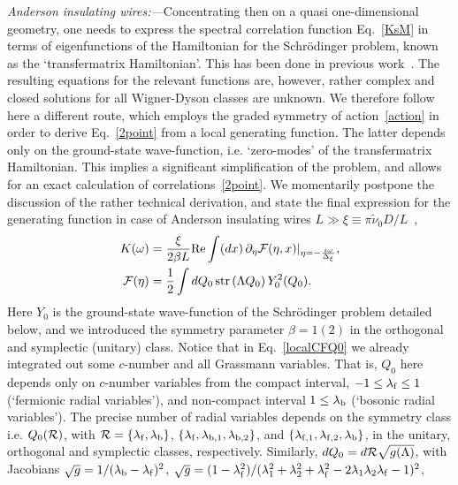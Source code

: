 \documentclass[twocolumn,showpacs,aps,prl]{revtex4}
\begin{document}
{\it Anderson insulating wires:---}Concentrating then on a quasi one-dimensional geometry, 
one needs to express the 
spectral correlation function Eq.~\eqref{KsM} in terms of  
eigenfunctions of the Hamiltonian for the Schr\"odinger problem, known as
the `transfermatrix Hamiltonian'. 
This has been done in previous work~\cite{EfetovBook,altlandfuchs}. 
The resulting equations for the relevant functions are, however, 
 rather complex and closed solutions for all Wigner-Dyson classes are unknown. 
 We therefore follow here 
a different route, which employs the graded symmetry of action~\eqref{action} in order  
to 
 derive Eq.~\eqref{2point} from a local generating function.
 The latter  
depends only on the ground-state wave-function, i.e. `zero-modes' of the transfermatrix Hamiltonian. 
This implies 
a significant simplification of the problem, and allows for an exact calculation of correlations~\eqref{2point}. 
We momentarily postpone the discussion of the rather technical derivation, 
and state the final expression for the generating function in case of Anderson insulating wires 
$L\gg \xi\equiv\pi\tilde{\nu}_0D/L$~\cite{fn3},
\begin{align}
\label{localCFQ0}
K(\omega)
&=
{\xi\over 2\beta L}
{\rm Re}
\int(dx)\,\partial_\eta{\cal F}(\eta,x)|_{\eta=-{i\omega\over\Delta_\xi}},
\nonumber \\
{\cal F}(\eta)
&={1\over 2}\int dQ_0\, 
{\rm str}\left(\Lambda Q_0\right)Y^2_0(Q_0).
\end{align}
Here $Y_0$ is the ground-state wave-function of the Schr\"odinger problem detailed below,  
and we introduced the symmetry parameter $\beta=1(2)$ in the 
orthogonal and symplectic (unitary) class. 
Notice that in Eq.~\eqref{localCFQ0} we already integrated out some $c$-number 
and all Grassmann variables. That is, 
$Q_0$ here depends only on $c$-number variables from the compact interval, 
$-1\leq \lambda_{\rm f} \leq 1$ (`fermionic radial variables'), 
and non-compact interval $1\leq \lambda_{\rm b}$ (`bosonic radial variables').
The precise number of radial variables depends on the symmetry class
i.e. $Q_0({\cal R})$, with 
${\cal R}=\{\lambda_{\rm f},\lambda_{\rm b}\}$,
$\{\lambda_{\rm f},\lambda_{\rm b,1},\lambda_{\rm b,2}\}$, 
and 
$\{\lambda_{\rm f,1},\lambda_{\rm f,2},\lambda_{\rm b}\}$, 
in the unitary, orthogonal and symplectic classes, respectively.
Similarly,  
$dQ_0=d{\cal R} \sqrt{g(\Lambda)}$,  
  with  
  Jacobians 
 $\sqrt{g}=1/(\lambda_{\rm b}-\lambda_{\rm f})^2$,
$\sqrt{g}=(1-\lambda^2_{\rm f})/(\lambda_1^2+\lambda_2^2+\lambda_{\rm f}^2-2\lambda_1\lambda_2\lambda_{\rm f}-1)^2$,
\end{document}
